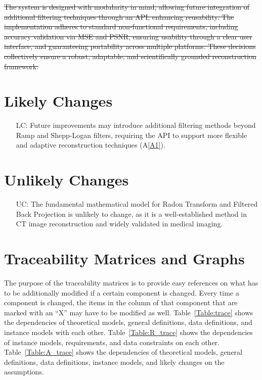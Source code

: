 \documentclass[12pt]{article}
\newcounter{lcnum} %
\newcounter{ucnum} %
\begin{document}
\st{The system is designed with modularity in mind, allowing future integration of
additional filtering techniques through an API, enhancing reusability. The
implementation adheres to standard non-functional requirements, including
accuracy validation via MSE and PSNR, ensuring usability through a clear user
interface, and guaranteeing portability across multiple platforms. These
decisions collectively ensure a robust, adaptable, and scientifically grounded
reconstruction framework.}
\section{Likely Changes}

\noindent \begin{itemize}

\item[LC\refstepcounter{lcnum}\thelcnum\label{LC_1}:] Future improvements may
  introduce additional filtering methods beyond Ramp and Shepp-Logan filters,
  requiring the API to support more flexible and adaptive reconstruction
  techniques (A\ref{A1}).

\end{itemize}

\section{Unlikely Changes}

\noindent \begin{itemize}

\item[UC\refstepcounter{ucnum}\theucnum\label{UC_1}:] The fundamental mathematical
  model for Radon Transform and Filtered Back Projection is unlikely to change,
  as it is a well-established method in CT image reconstruction and widely
  validated in medical imaging.
\end{itemize}

\section{Traceability Matrices and Graphs}

The purpose of the traceability matrices is to provide easy references on what
has to be additionally modified if a certain component is changed.  Every time a
component is changed, the items in the column of that component that are marked
with an ``X'' may have to be modified as well.  Table~\ref{Table:trace} shows the
dependencies of theoretical models, general definitions, data definitions, and
instance models with each other. Table~\ref{Table:R_trace} shows the
dependencies of instance models, requirements, and data constraints on each
other. Table~\ref{Table:A_trace} shows the dependencies of theoretical models,
general definitions, data definitions, instance models, and likely changes on
the assumptions.
\end{document}
